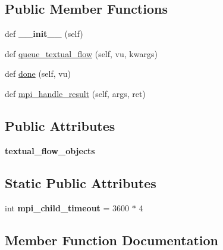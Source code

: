 \subsection*{Public Member Functions}
\begin{DoxyCompactItemize}
\item 
\mbox{\label{classCBGM_1_1lib_1_1textual__flow_1_1MpiHandler_a3e1d8d0e16343d1b40a9adc9dd2eccc6}} 
def {\bfseries \+\_\+\+\_\+init\+\_\+\+\_\+} (self)
\item 
def \hyperlink{classCBGM_1_1lib_1_1textual__flow_1_1MpiHandler_a866c669ed6a88f73639cb286582582db}{queue\+\_\+textual\+\_\+flow} (self, vu, kwargs)
\item 
def \hyperlink{classCBGM_1_1lib_1_1textual__flow_1_1MpiHandler_a886c86704d9eda0327d5cf0c9be5b642}{done} (self, vu)
\item 
def \hyperlink{classCBGM_1_1lib_1_1textual__flow_1_1MpiHandler_acce71484acbf342eb74a73b1a663c188}{mpi\+\_\+handle\+\_\+result} (self, args, ret)
\end{DoxyCompactItemize}
\subsection*{Public Attributes}
\begin{DoxyCompactItemize}
\item 
\mbox{\label{classCBGM_1_1lib_1_1textual__flow_1_1MpiHandler_a4088373003a58f5f72502a940149a609}} 
{\bfseries textual\+\_\+flow\+\_\+objects}
\end{DoxyCompactItemize}
\subsection*{Static Public Attributes}
\begin{DoxyCompactItemize}
\item 
\mbox{\label{classCBGM_1_1lib_1_1textual__flow_1_1MpiHandler_abab146805ac64b7806ecc9814d08da97}} 
int {\bfseries mpi\+\_\+child\+\_\+timeout} = 3600 $\ast$ 4
\end{DoxyCompactItemize}


\subsection{Member Function Documentation}
\mbox{\label{classCBGM_1_1lib_1_1textual__flow_1_1MpiHandler_a886c86704d9eda0327d5cf0c9be5b642}} 

